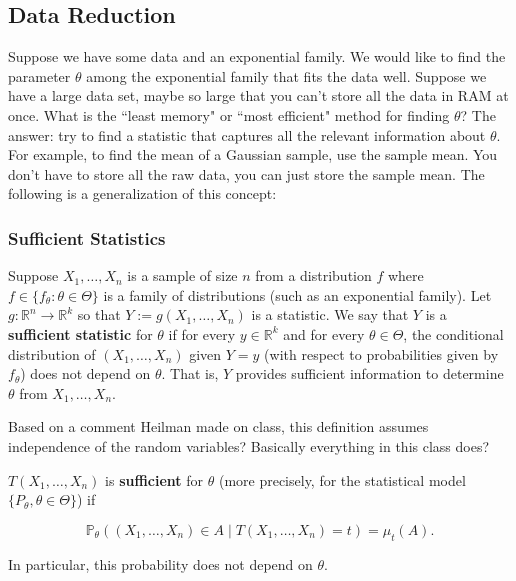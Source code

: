 \subsection{Data Reduction}

Suppose we have some data and an exponential family. We would like to find the parameter \(\theta\) among the exponential family that fits the data well. Suppose we have a large data set, maybe so large that you can't store all the data in RAM at once. What is the ``least memory" or ``most efficient" method for finding \(\theta\)? The answer: try to find a statistic that captures all the relevant information about \(\theta\). For example, to find the mean of a Gaussian sample, use the sample mean. You don't have to store all the raw data, you can just store the sample mean. The following is a generalization of this concept:

\subsubsection{Sufficient Statistics}

\begin{definition} Suppose \(X_1, \ldots, X_n\) is a sample of size \(n\) from a distribution \(f\) where \(f \in \{f_\theta: \theta \in \Theta \}\) is a family of distributions (such as an exponential family). Let \(g: \mathbb{R}^n \to \mathbb{R}^k\) so that \(Y:= g(X_1, \ldots, X_n) \) is a statistic. We say that \(Y\) is a \textbf{sufficient statistic} for \(\theta\) if for every \(y \in \mathbb{R}^k\) and for every \(\theta \in \Theta\), the conditional distribution of \((X_1, \ldots, X_n)\) given \(Y=y\) (with respect to probabilities given by \(f_\theta\)) does not depend on \(\theta\). That is, \(Y\) provides sufficient information to determine \(\theta\) from \(X_1, \ldots, X_n\).

\end{definition}

\begin{remark} Based on a comment Heilman made on class, this definition assumes independence of the random variables? Basically everything in this class does?

\end{remark}

\begin{definition} \(T(X_1, \ldots, X_n)\) is \textbf{sufficient} for \(\theta\) (more precisely, for the statistical model \(\{P_\theta, \theta \in \Theta\}\)) if 

\[
\mathbb{P}_\theta( (X_1, \ldots, X_n)  \in A \mid T(X_1, \ldots, X_n) = t) = \mu_t(A).
\]

In particular, this probability does not depend on \(\theta\).

\end{definition}

